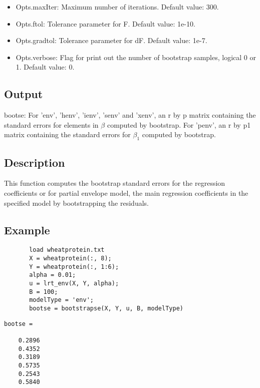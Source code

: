 \documentclass[a4paper,11pt,openany]{memoir}
\begin{document}
\begin{itemize}
\setlength{\itemsep}{-1ex}
   \item Opts.maxIter: Maximum number of iterations.  Default value: 300.
   \item Opts.ftol: Tolerance parameter for F.  Default value: 1e-10.
   \item Opts.gradtol: Tolerance parameter for dF.  Default value: 1e-7.
   \item Opts.verbose: Flag for print out the number of bootstrap samples, logical 0 or 1. Default value: 0.
\end{itemize}


\subsection*{Output}

\begin{par}
bootse: For 'env', 'henv', 'ienv', 'senv' and 'xenv', an r by p matrix containing the standard errors for elements in $\beta$ computed by bootstrap.  For 'penv', an r by p1 matrix containing the standard errors for $\beta_1$ computed by bootstrap.
\end{par} \vspace{1em}


\subsection*{Description}

\begin{par}
This function computes the bootstrap standard errors for the regression coefficients or for partial envelope model, the main regression coefficients in the specified model by bootstrapping the residuals.
\end{par} \vspace{1em}


\subsection*{Example}


\begin{verbatim}       load wheatprotein.txt
       X = wheatprotein(:, 8);
       Y = wheatprotein(:, 1:6);
       alpha = 0.01;
       u = lrt_env(X, Y, alpha);
       B = 100;
       modelType = 'env';
       bootse = bootstrapse(X, Y, u, B, modelType)\end{verbatim}
        \color{lightgray}\ttfamily 
        \begin{verbatim}
bootse =

    0.2896
    0.4352
    0.3189
    0.5735
    0.2543
    0.5840
\end{verbatim} 
\rmfamily
\color{black}
    
\end{document}
